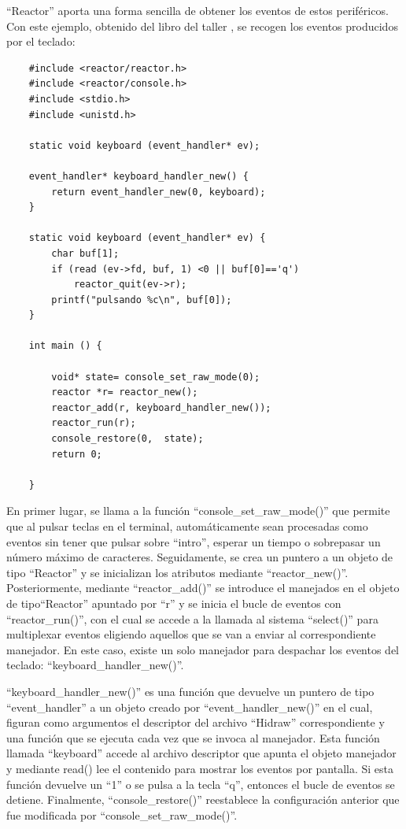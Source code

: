 ``Reactor'' aporta una forma sencilla de obtener los eventos de estos periféricos. Con este ejemplo, obtenido del libro del taller \citep[pág. 98--99]{tallerRPi}, se recogen los eventos producidos por el teclado:

\begin{verbatim}
    #include <reactor/reactor.h>
    #include <reactor/console.h>
    #include <stdio.h>
    #include <unistd.h>
    
    static void keyboard (event_handler* ev);
   
    event_handler* keyboard_handler_new() {
    	return event_handler_new(0, keyboard);
    }
    
    static void keyboard (event_handler* ev) {
    	char buf[1];
    	if (read (ev->fd, buf, 1) <0 || buf[0]=='q')
    		reactor_quit(ev->r);
    	printf("pulsando %c\n", buf[0]);
    }
    
    int main () {
    	
    	void* state= console_set_raw_mode(0);
    	reactor *r= reactor_new();
    	reactor_add(r, keyboard_handler_new());
    	reactor_run(r);
    	console_restore(0,  state);
    	return 0;
    	
    }
    \end{verbatim}

En primer lugar, se llama a la función ``console\_set\_raw\_mode()'' que permite que al pulsar teclas en el terminal, automáticamente sean procesadas como eventos sin tener que pulsar sobre ``intro'', esperar un tiempo o sobrepasar un número máximo de caracteres. Seguidamente, se crea un puntero a un objeto de tipo ``Reactor'' y se inicializan los atributos mediante ``reactor\_new()''. Posteriormente, mediante ``reactor\_add()'' se introduce el manejados en el objeto de tipo``Reactor'' apuntado por ``r'' y se inicia el bucle de eventos con ``reactor\_run()'', con el cual se accede a la llamada al sistema ``select()'' para multiplexar eventos eligiendo aquellos que se van a enviar al correspondiente manejador. En este caso, existe un solo manejador para despachar los eventos del teclado: ``keyboard\_handler\_new()''.

``keyboard\_handler\_new()'' es una función que devuelve un puntero de tipo ``event\_handler'' a un objeto creado por ``event\_handler\_new()'' en el cual, figuran como argumentos el descriptor del archivo ``Hidraw'' correspondiente y una función que se ejecuta cada vez que se invoca al manejador. Esta función llamada ``keyboard'' accede al archivo descriptor que apunta el objeto manejador y mediante read() lee el contenido para mostrar los eventos por pantalla. Si esta función devuelve un ``1'' o se pulsa a la tecla ``q'', entonces el bucle de eventos se detiene. Finalmente, ``console\_restore()'' reestablece la configuración anterior que fue modificada por ``console\_set\_raw\_mode()''.



